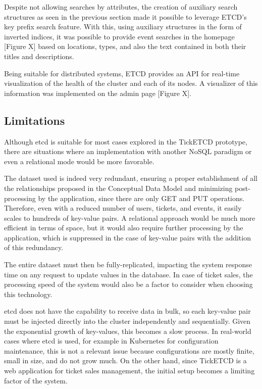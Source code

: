 \documentclass[screen,review]{acmart}
\begin{document}
Despite not allowing searches by attributes, the creation of auxiliary search structures as seen in the previous section made it possible to leverage ETCD's key prefix search feature. With this, using auxiliary structures in the form of inverted indices, it was possible to provide event searches in the homepage [Figure X] based on locations, types, and also the text contained in both their titles and descriptions.

Being suitable for distributed systems, ETCD provides an API for real-time visualization of the health of the cluster and each of its nodes. A visualizer of this information was implemented on the admin page [Figure X].

\subsection{Limitations}
Although etcd is suitable for most cases explored in the TickETCD prototype, there are situations where an implementation with another NoSQL paradigm or even a relational mode would be more favorable.

The dataset used is indeed very redundant, ensuring a proper establishment of all the relationships proposed in the Conceptual Data Model and minimizing post-processing by the application, since there are only GET and PUT operations. Therefore, even with a reduced number of users, tickets, and events, it easily scales to hundreds of key-value pairs. A relational approach would be much more efficient in terms of space, but it would also require further processing by the application, which is suppressed in the case of key-value pairs with the addition of this redundancy.

The entire dataset must then be fully-replicated, impacting the system response time on any request to update values in the database. In case of ticket sales, the processing speed of the system would also be a factor to consider when choosing this technology.

etcd does not have the capability to receive data in bulk, so each key-value pair must be injected directly into the cluster independently and sequentially. Given the exponential growth of key-values, this becomes a slow process. In real-world cases where etcd is used, for example in Kubernetes for configuration maintenance, this is not a relevant issue because configurations are mostly finite, small in size, and do not grow much. On the other hand, since TickETCD is a web application for ticket sales management, the initial setup becomes a limiting factor of the system.
\end{document}

